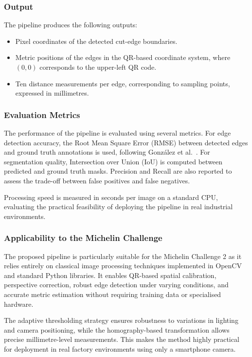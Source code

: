 \documentclass[11pt]{article}
\begin{document}
\subsubsection{Output}

The pipeline produces the following outputs:
\begin{itemize}
    \item Pixel coordinates of the detected cut-edge boundaries.
    \item Metric positions of the edges in the QR-based coordinate system, where $(0,0)$ corresponds to the upper-left QR code.
    \item Ten distance measurements per edge, corresponding to sampling points, expressed in millimetres.
\end{itemize}

\subsubsection{Evaluation Metrics}

The performance of the pipeline is evaluated using several metrics. For edge detection accuracy, the Root Mean Square Error (RMSE) between detected edges and ground truth annotations is used, following González et al.~\cite{Gonzalez2024}. For segmentation quality, Intersection over Union (IoU) is computed between predicted and ground truth masks. Precision and Recall are also reported to assess the trade-off between false positives and false negatives.

Processing speed is measured in seconds per image on a standard CPU, evaluating the practical feasibility of deploying the pipeline in real industrial environments.

\subsubsection{Applicability to the Michelin Challenge}

The proposed pipeline is particularly suitable for the Michelin Challenge 2 as it relies entirely on classical image processing techniques implemented in OpenCV and standard Python libraries. It enables QR-based spatial calibration, perspective correction, robust edge detection under varying conditions, and accurate metric estimation without requiring training data or specialised hardware.

The adaptive thresholding strategy ensures robustness to variations in lighting and camera positioning, while the homography-based transformation allows precise millimetre-level measurements. This makes the method highly practical for deployment in real factory environments using only a smartphone camera.
\end{document}
